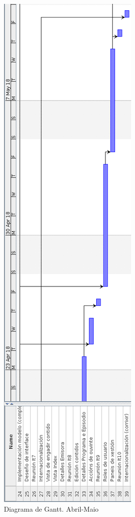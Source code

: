 \begin{figure}[H]
	\centering
	\includegraphics[scale=0.45,keepaspectratio=true]{./images/gantt/g9.png}
	\caption{Diagrama de Gantt. Abril-Maio}
\end{figure}

